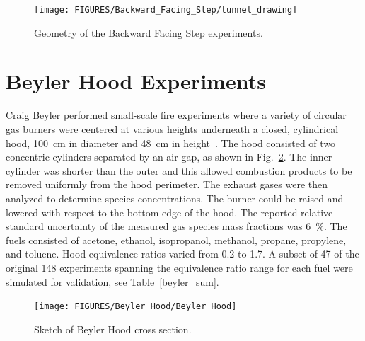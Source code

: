\begin{figure}[!ht]
\texttt{[image: FIGURES/Backward\_Facing\_Step/tunnel\_drawing]}
\caption[Geometry of the Backward Facing Step experiments]{Geometry of the Backward Facing Step experiments.}
\label{tunnel_drawing}
\end{figure}


\section{Beyler Hood Experiments}
\label{Beyler_Hood_Description}

Craig Beyler performed small-scale fire experiments where a variety of circular gas burners were centered at various heights underneath a closed, cylindrical hood, 100~cm in diameter and 48~cm in height~\cite{Beyler:Hood}.  The hood consisted of two concentric cylinders separated by an air gap, as shown in Fig.~\ref{Beyler_Hood_Sketch}.  The inner cylinder was shorter than the outer and this allowed combustion products to be removed uniformly from the hood perimeter.  The exhaust gases were then analyzed to determine species concentrations. The burner could be raised and lowered with respect to the bottom edge of the hood. The reported relative standard uncertainty of the measured gas species mass fractions was 6~\%. The fuels consisted of acetone, ethanol, isopropanol, methanol, propane, propylene, and toluene. Hood equivalence ratios varied from 0.2 to 1.7.  A subset of 47 of the original 148 experiments spanning the equivalence ratio range for each fuel were simulated for validation, see Table~\ref{beyler_sum}.

\begin{figure}[h]
\centering
\texttt{[image: FIGURES/Beyler\_Hood/Beyler\_Hood]}
\caption[Sketch of Beyler Hood cross section]{Sketch of Beyler Hood cross section.}
\label{Beyler_Hood_Sketch}
\end{figure}

